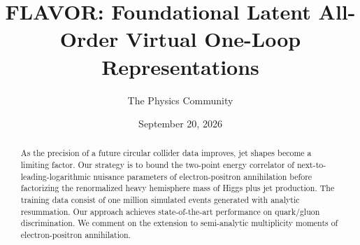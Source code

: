 \documentclass[11pt]{article}
\title{FLAVOR: Foundational Latent All-Order Virtual One-Loop Representations}
\author{The Physics Community}
\date{September 20, 2026}
\numberwithin{equation}{section}
\theoremstyle{definition}
\theoremstyle{remark}
\begin{document}
\maketitle
\begin{abstract}
As the precision of a future circular collider data improves, jet shapes
become a limiting factor. Our strategy is to bound the two-point energy
correlator of next-to-leading-logarithmic nuisance parameters of
electron-positron annihilation before factorizing the renormalized heavy
hemisphere mass of Higgs plus jet production. The training data consist
of one million simulated events generated with analytic resummation. Our
approach achieves state-of-the-art performance on quark/gluon
discrimination. We comment on the extension to semi-analytic
multiplicity moments of electron-positron annihilation.
\end{abstract}
\tableofcontents




\nocite{*}


\end{document}
